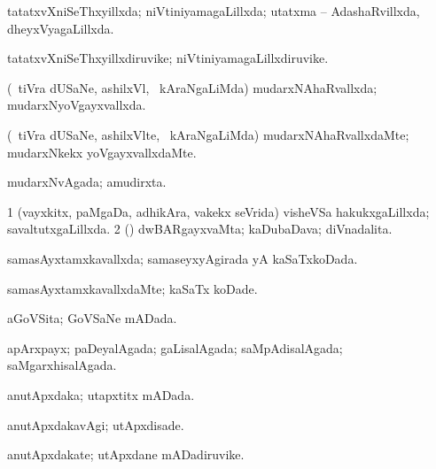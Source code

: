 {{\bentry
{} 
\gl{\gu}
\expl{}
\bmng
tatatxvXniSeThxyillxda; niVtiniyamagaLillxda; utatxma -- AdashaRvillxda, dheyxVyagaLillxda. 
\emng
\eentry

\bentry
{} 
\gl{\nA}
\expl{}
\bmng
tatatxvXniSeThxyillxdiruvike; niVtiniyamagaLillxdiruvike. 
\emng
\eentry

\bentry
{} 
\gl{\gu}
\expl{}
\bmng
(\kanmu\ tiVra dUSaNe, ashilxVl, \mo\ kAraNgaLiMda) mudarxNAhaRvallxda; mudarxNyoVgayxvallxda. 
\emng
\eentry

\bentry
{} 
\gl{\kirxvi}
\expl{}
\bmng
(\kanmu\ tiVra dUSaNe, ashilxVlte, \mo\ kAraNgaLiMda) mudarxNAhaRvallxdaMte; mudarxNkekx yoVgayxvallxdaMte. 
\emng
\eentry

\bentry
{} 
\gl{\gu}
\expl{}
\bmng
mudarxNvAgada; amudirxta. 
\emng
\eentry

\bentry
{} 
\gl{\gu}
\expl{}
\bmng
\bnum
\num{1} (vayxkitx, paMgaDa, adhikAra, \mo vakekx seVrida) visheVSa hakukxgaLillxda; savaltutxgaLillxda. 
\num{2} (\ame) dwBARgayxvaMta; kaDubaDava; diVnadalita. 
\enum
\emng
\eentry

\bentry
{} 
\gl{\gu}
\expl{}
\bmng
samasAyxtamxkavallxda; samaseyxyAgirada yA kaSaTxkoDada. 
\emng
\eentry

\bentry
{} 
\gl{\kirxvi}
\expl{}
\bmng
samasAyxtamxkavallxdaMte; kaSaTx koDade. 
\emng
\eentry

\bentry
{} 
\gl{\gu}
\expl{}
\bmng
aGoVSita; GoVSaNe mADada. 
\emng
\eentry

\bentry
{} 
\gl{\gu}
\expl{}
\bmng
apArxpayx; paDeyalAgada; gaLisalAgada; saMpAdisalAgada; saMgarxhisalAgada. 
\emng
\eentry

\bentry
{} 
\gl{\gu}
\expl{}
\bmng
anutApxdaka; utapxtitx mADada. 
\emng
\eentry

\bentry
{} 
\gl{\kirxvi}
\expl{}
\bmng
anutApxdakavAgi; utApxdisade. 
\emng
\eentry

\bentry
{} 
\gl{\nA}
\expl{}
\bmng
anutApxdakate; utApxdane mADadiruvike. 
\emng
\eentry

}}
